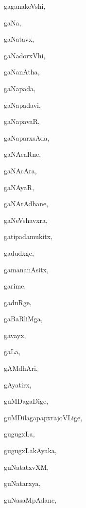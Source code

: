 \begin{multicols}{3}
{\noindent
{gaganakeVshi}, \pageref{gaganakeVshi}

\noindent
{gaNa}, \pageref{gaNa}

\noindent
{gaNatavx}, \pageref{gaNatavx}

\noindent
{gaNadorxVhi}, \pageref{gaNadorxVhi}

\noindent
{gaNanAtha}, \pageref{gaNanAtha}

\noindent
{gaNapada}, \pageref{gaNapada}

\noindent
{gaNapadavi}, \pageref{gaNapadavi}

\noindent
{gaNapavaR}, \pageref{gaNapavaR}

\noindent
{gaNaparxsAda}, \pageref{gaNaparxsAda}

\noindent
{gaNAcaRne}, \pageref{gaNAcaRne}

\noindent
{gaNAcAra}, \pageref{gaNAcAra}

\noindent
{gaNAyaR}, \pageref{gaNAyaR}

\noindent
{gaNArAdhane}, \pageref{gaNArAdhane}

\noindent
{gaNeVshavxra}, \pageref{gaNeVshavxra}

\noindent
{gatipadamukitx}, \pageref{gatipadamukitx}

\noindent
{gadudxge}, \pageref{gadudxge}

\noindent
{gamananAsitx}, \pageref{gamananAsitx}

\noindent
{garime}, \pageref{garime}

\noindent
{gaduRge}, \pageref{gaduRge}

\noindent
{gaBaRliMga}, \pageref{gaBaRliMga}

\noindent
{gavayx}, \pageref{gavayx}

\noindent
{gaLa}, \pageref{gaLa}

\noindent
{gAMdhAri}, \pageref{gAMdhAri}

\noindent
{gAyatirx}, \pageref{gAyatirx}

\noindent
{guMDagaDige}, \pageref{guMDagaDige}

\noindent
{guMDilagapapxrajoVLige}, \pageref{guMDilagapapxrajoVLige}

\noindent
{gugugxLa}, \pageref{gugugxLa}

\noindent
{gugugxLakAyaka}, \pageref{gugugxLakAyaka}

\noindent
{guNatatxvXM}, \pageref{guNatatxvXM}

\noindent
{guNatarxya}, \pageref{guNatarxya}

\noindent
{guNasaMpAdane}, \pageref{guNasaMpAdane}

}
\end{multicols}

